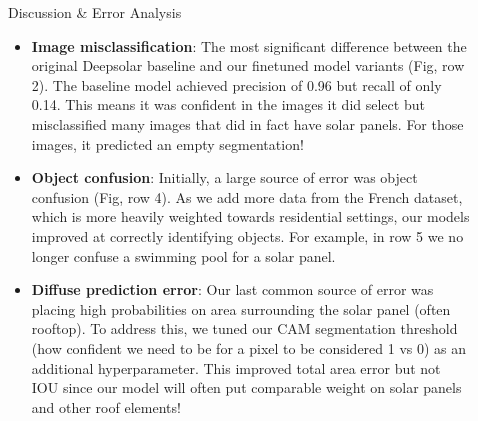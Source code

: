 \documentclass[final]{beamer}
\newlength{\sepwidth}
\newlength{\colwidth}
\newcommand{\separatorcolumn}{\begin{column}{\sepwidth}\end{column}}
\begin{document}
\begin{frame}[t]
\begin{columns}[t]
\begin{column}{\colwidth}
\end{column}

\separatorcolumn

\begin{column}{\colwidth}

\begin{block}{Discussion \& Error Analysis}
\begin{minipage}[t]{0.45\linewidth}
\begin{itemize}
    \item \textbf{Image misclassification}: The most significant difference between the original Deepsolar baseline and our finetuned model variants (Fig, row 2). The baseline model achieved precision of 0.96 but recall of only 0.14. This means it was confident in the images it did select but misclassified many images that did in fact have solar panels. For those images, it predicted an empty segmentation! \\[20pt]
    
    \item \textbf{Object confusion}: Initially, a large source of error was object confusion (Fig, row 4). As we add more data from the French dataset, which is more heavily weighted towards residential settings, our models improved at correctly identifying objects. For example, in row 5 we no longer confuse a swimming pool for a solar panel. \\[20pt]

    \item \textbf{Diffuse prediction error}: Our last common source of error was placing high probabilities on area surrounding the solar panel (often rooftop). To address this, we tuned our CAM segmentation threshold (how confident we need to be for a pixel to be considered 1 vs 0) as an additional hyperparameter. This improved total area error but not IOU since our model will often put comparable weight on solar panels and other roof elements!
    
\end{itemize}


\end{minipage}
\end{block}
\end{column}
\end{columns}
\end{frame}
\end{document}
